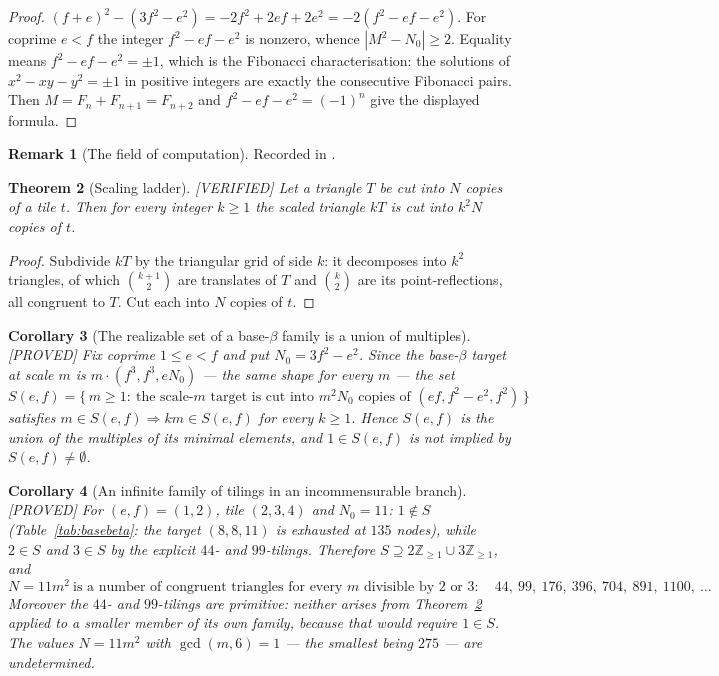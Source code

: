 \documentclass[11pt,reqno]{amsart}
\theoremstyle{plain}
\newtheorem{theorem}{Theorem}
\newtheorem{corollary}[theorem]{Corollary}
\theoremstyle{definition}
\newtheorem{remark}[theorem]{Remark}
\newcommand{\Z}{\mathbb{Z}}
\newcommand{\lab}[1]{\hfill\textnormal{\footnotesize\textsc{[#1]}}}
\begin{document}
\begin{proof}
$(f+e)^2-(3f^2-e^2)=-2f^2+2ef+2e^2=-2(f^2-ef-e^2)$. For coprime $e<f$ the integer $f^2-ef-e^2$ is
nonzero, whence $|M^2-N_0|\ge2$. Equality means $f^2-ef-e^2=\pm1$, which is the Fibonacci
characterisation: the solutions of $x^2-xy-y^2=\pm1$ in positive integers are exactly the consecutive
Fibonacci pairs. Then $M=F_n+F_{n+1}=F_{n+2}$ and $f^2-ef-e^2=(-1)^n$ give the displayed formula.
\end{proof}

\begin{remark}[The field of computation]\label{rem:fieldshort}
Recorded in \cite{Obstructions}.
\end{remark}

\begin{theorem}[Scaling ladder]\label{thm:ladder}\lab{VERIFIED}
Let a triangle $T$ be cut into $N$ copies of a tile $t$. Then for every integer $k\ge1$ the scaled
triangle $kT$ is cut into $k^2N$ copies of $t$.
\end{theorem}

\begin{proof}
Subdivide $kT$ by the triangular grid of side $k$: it decomposes into $k^2$ triangles, of which
$\binom{k+1}{2}$ are translates of $T$ and $\binom{k}{2}$ are its point-reflections, all congruent to
$T$. Cut each into $N$ copies of $t$.
\end{proof}

\begin{corollary}[The realizable set of a base-$\beta$ family is a union of multiples]\label{cor:ladder}\lab{PROVED}
Fix coprime $1\le e<f$ and put $N_0=3f^2-e^2$. Since the base-$\beta$ target at scale $m$ is
$m\cdot(f^3,f^3,eN_0)$ --- the same shape for every $m$ --- the set
\[
S(e,f)=\{\,m\ge1:\ \text{the scale-$m$ target is cut into } m^2N_0 \text{ copies of } (ef,f^2-e^2,f^2)\,\}
\]
satisfies $m\in S(e,f)\Rightarrow km\in S(e,f)$ for every $k\ge1$. Hence $S(e,f)$ is the union of the
multiples of its minimal elements, and $1\in S(e,f)$ is \emph{not} implied by $S(e,f)\ne\emptyset$.
\end{corollary}

\begin{corollary}[An infinite family of tilings in an incommensurable branch]\label{cor:elevenm}\lab{PROVED}
For $(e,f)=(1,2)$, tile $(2,3,4)$ and $N_0=11$: $1\notin S$ (Table~\ref{tab:basebeta}: the target
$(8,8,11)$ is exhausted at $135$ nodes), while $2\in S$ and $3\in S$ by the explicit $44$- and
$99$-tilings. Therefore $S\supseteq 2\Z_{\ge1}\cup 3\Z_{\ge1}$, and
\[
N=11m^2 \ \text{is a number of congruent triangles for every } m \text{ divisible by } 2 \text{ or } 3:
\quad 44,\ 99,\ 176,\ 396,\ 704,\ 891,\ 1100,\ \dots
\]
Moreover the $44$- and $99$-tilings are \emph{primitive}: neither arises from Theorem~\ref{thm:ladder}
applied to a smaller member of its own family, because that would require $1\in S$. The values
$N=11m^2$ with $\gcd(m,6)=1$ --- the smallest being $275$ --- are undetermined.
\end{corollary}
\end{document}

